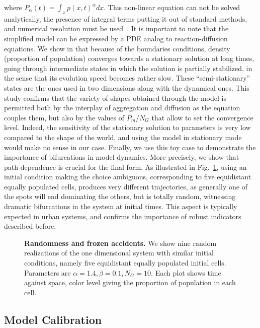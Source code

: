 \documentclass[10pt,letterpaper]{article}
\begin{document}
where $P_{\alpha}(t) = \int_x p(x,t)^{\alpha} dx$. This non-linear equation can not be solved analytically, the presence of integral terms putting it out of standard methods, and numerical resolution must be used~\cite{tadmor2012review}. It is important to note that the simplified model can be expressed by a PDE analog to reaction-diffusion equations. We show in  that because of the boundaries conditions, density (proportion of population) converges towards a stationary solution at long times, going through intermediate states in which the solution is partially stabilized, in the sense that its evolution speed becomes rather slow. These ``semi-stationary'' states are the ones used in two dimensions along with the dynamical ones. This study confirms that the variety of shapes obtained through the model is permitted both by the interplay of aggregation and diffusion as the equation couples them, but also by the values of $P_m / N_G$ that allow to set the convergence level. Indeed, the sensitivity of the stationary solution to parameters is very low compared to the shape of the world, and using the model in stationary mode would make no sense in our case. Finally, we use this toy case to demonstrate the importance of bifurcations in model dynamics. More precisely, we show that path-dependence is crucial for the final form. As illustrated in Fig.~\ref{fig:fig4}, using an initial condition making the choice ambiguous, corresponding to five equidistant equally populated cells, produces very different trajectories, as generally one of the spots will end dominating the others, but is totally random, witnessing dramatic bifurcations in the system at initial times. This aspect is typically expected in urban systems, and confirms the importance of robust indicators described before.


\begin{figure}
\caption{\textbf{Randomness and frozen accidents.} We show nine random realizations of the one dimensional system with similar initial conditions, namely five equidistant equally populated initial cells. Parameters are $\alpha = 1.4,\beta =0.1,N_G=10$. Each plot shows time against space, color level giving the proportion of population in each cell.}
\label{fig:fig4}
\end{figure}





\subsection*{Model Calibration}
\end{document}
